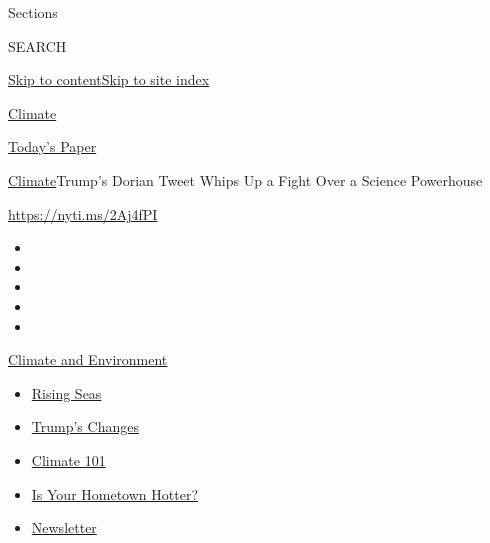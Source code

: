 Sections

SEARCH

\protect\hyperlink{site-content}{Skip to
content}\protect\hyperlink{site-index}{Skip to site index}

\href{https://www.nytimes.com/section/climate}{Climate}

\href{https://myaccount.nytimes.com/auth/login?response_type=cookie\&client_id=vi}{}

\href{https://www.nytimes.com/section/todayspaper}{Today's Paper}

\href{/section/climate}{Climate}\textbar{}Trump's Dorian Tweet Whips Up
a Fight Over a Science Powerhouse

\url{https://nyti.ms/2Aj4fPI}

\begin{itemize}
\item
\item
\item
\item
\item
\end{itemize}

\href{https://www.nytimes.com/section/climate?action=click\&pgtype=Article\&state=default\&region=TOP_BANNER\&context=storylines_menu}{Climate
and Environment}

\begin{itemize}
\tightlist
\item
  \href{https://www.nytimes.com/2020/07/30/climate/sea-level-inland-floods.html?action=click\&pgtype=Article\&state=default\&region=TOP_BANNER\&context=storylines_menu}{Rising
  Seas}
\item
  \href{https://www.nytimes.com/interactive/2020/climate/trump-environment-rollbacks.html?action=click\&pgtype=Article\&state=default\&region=TOP_BANNER\&context=storylines_menu}{Trump's
  Changes}
\item
  \href{https://www.nytimes.com/interactive/2020/04/19/climate/climate-crash-course-1.html?action=click\&pgtype=Article\&state=default\&region=TOP_BANNER\&context=storylines_menu}{Climate
  101}
\item
  \href{https://www.nytimes.com/interactive/2018/08/30/climate/how-much-hotter-is-your-hometown.html?action=click\&pgtype=Article\&state=default\&region=TOP_BANNER\&context=storylines_menu}{Is
  Your Hometown Hotter?}
\item
  \href{https://www.nytimes.com/newsletters/climate-change?action=click\&pgtype=Article\&state=default\&region=TOP_BANNER\&context=storylines_menu}{Newsletter}
\end{itemize}

